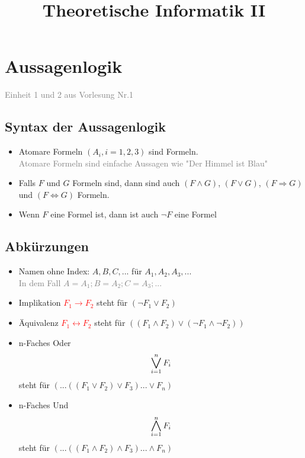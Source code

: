 \documentclass{article}
\title{Theoretische Informatik II}
\date{}
\def\Wedgeop{\operatornamewithlimits{%
		\mathchoice{\vcenter{\hbox{\huge $\wedge$}}}
		{\vcenter{\hbox{\Large $\wedge$}}}
		{\mathrm{A}}
		{\mathrm{A}}}}
\def\Veeop{\operatornamewithlimits{%
		\mathchoice{\vcenter{\hbox{\huge $\vee$}}}
		{\vcenter{\hbox{\Large $\vee$}}}
		{\mathrm{A}}
		{\mathrm{A}}}}
\begin{document}
	\maketitle
	\tableofcontents
	\newpage
	
	\section{Aussagenlogik}
	\textcolor{gray}{Einheit 1 und 2 aus Vorlesung Nr.1} \\
	
	\subsection{Syntax der Aussagenlogik}
	\begin{itemize}
		\item Atomare Formeln $(A_i, i =1,2,3)$ sind Formeln.\\
		\textcolor{gray}{Atomare Formeln sind einfache Aussagen wie "Der Himmel ist Blau"}
		\item Falls $F$ und $G$ Formeln sind, dann sind auch $(F \wedge G)$, $(F \vee G)$, $(F \Rightarrow G)$ und $(F \Leftrightarrow G)$ Formeln.
		\item Wenn $F$ eine Formel ist, dann ist auch $\neg F$ eine Formel
	\end{itemize}
	
	\subsection{Abkürzungen}
	\begin{itemize}
		\item Namen ohne Index: $A, B, C, ...$ für $A_1, A_2, A_3, ...$\\
		\textcolor{gray}{In dem Fall $A = A_1; B = A_2; C = A_3; ...$}
		\item Implikation \textcolor{red}{$F_1 \rightarrow F_2$}	steht für $(\neg F_1 \vee F_2)$
		\item Äquivalenz \textcolor{red}{$F_1 \leftrightarrow F_2$}		steht für $((F_1 \wedge F_2) \vee (\neg F_1 \wedge \neg F_2))$ 
		\item n-Faches Oder \[\Veeop^{n}_{i = 1} F_i\] 
		steht für $(...((F_1 \vee F_2)\vee F_3)... \vee F_n)$
		\item n-Faches Und \[\Wedgeop^n_{i=1} F_i\]
		steht für $(...((F_1 \wedge F_2)\wedge F_3)... \wedge F_n)$
	\end{itemize}
	
\end{document}
